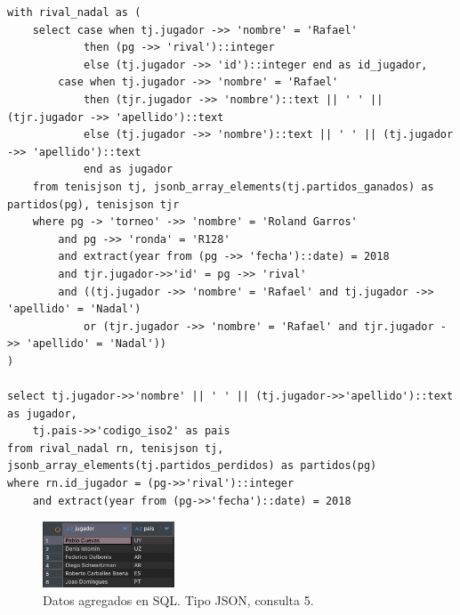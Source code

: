 \begin{verbatim}
with rival_nadal as (
	select case when tj.jugador ->> 'nombre' = 'Rafael' 
			then (pg ->> 'rival')::integer  
			else (tj.jugador ->> 'id')::integer end as id_jugador,
		case when tj.jugador ->> 'nombre' = 'Rafael' 
			then (tjr.jugador ->> 'nombre')::text || ' ' || (tjr.jugador ->> 'apellido')::text 
			else (tj.jugador ->> 'nombre')::text || ' ' || (tj.jugador ->> 'apellido')::text 
			end as jugador
	from tenisjson tj, jsonb_array_elements(tj.partidos_ganados) as partidos(pg), tenisjson tjr
    where pg -> 'torneo' ->> 'nombre' = 'Roland Garros' 
    	and pg ->> 'ronda' = 'R128'
		and extract(year from (pg ->> 'fecha')::date) = 2018
        and tjr.jugador->>'id' = pg ->> 'rival'
        and ((tj.jugador ->> 'nombre' = 'Rafael' and tj.jugador ->> 'apellido' = 'Nadal') 
        	or (tjr.jugador ->> 'nombre' = 'Rafael' and tjr.jugador ->> 'apellido' = 'Nadal'))
)

select tj.jugador->>'nombre' || ' ' || (tj.jugador->>'apellido')::text as jugador, 
	tj.pais->>'codigo_iso2' as pais
from rival_nadal rn, tenisjson tj, jsonb_array_elements(tj.partidos_perdidos) as partidos(pg)
where rn.id_jugador = (pg->>'rival')::integer 
	and extract(year from (pg->>'fecha')::date) = 2018
\end{verbatim}

\begin{figure}[H]
\centering
\includegraphics[width=0.35\textwidth]{fotos/q5_json.png}
\caption{Datos agregados en SQL. Tipo JSON, consulta 5.}
\label{fig:q5_json}
\end{figure}
